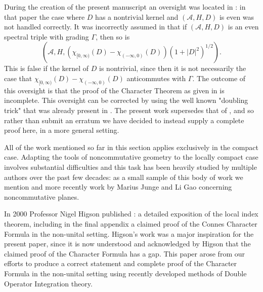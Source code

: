     During the creation of the present manuscript an oversight was located in \cite{CRSZ}: in that paper the case where $D$ has a nontrivial kernel
    and $(\mathcal{A},H,D)$ is even was not handled correctly. It was incorrectly assumed in \cite[Case 3, page 20]{CRSZ} that if $(\mathcal{A},H,D)$ is an even spectral triple
    with grading $\Gamma$, then so is
    $$(\mathcal{A},H,(\chi_{[0,\infty)}(D)-\chi_{(-\infty,0)}(D))(1+|D|^2)^{1/2}).$$
    This is false if the kernel of $D$ is nontrivial, since then it is not necessarily the case that $\chi_{[0,\infty)}(D)-\chi_{(-\infty,0)}(D)$ anticommutes with $\Gamma$. The outcome of this oversight is that the proof of the Character Theorem as given in \cite{CRSZ} is incomplete. This oversight can be corrected by using the well known "doubling trick" that was already present in \cite[Definition 6]{CPRS1}. The present work supersedes that of \cite{CRSZ}, and so rather than submit an erratum we have decided to instead supply a complete
    proof here, in a more general setting.
    
    
    All of the work mentioned so far in this section applies exclusively in the compact case. Adapting the tools of noncommutative geometry to the locally compact case involves substantial difficulties and this task has been heavily studied by multiple authors over the past few decades: as a small sample of this body of work we mention \cite{Rennie-2003, Rennie-2004, gayral-moyal, GIV, CGRS1, CGRS2} and more recently work by Marius Junge and Li Gao concerning noncommutative planes.
    
    In 2000 Professor Nigel Higson published \cite{higson}: a detailed exposition of the local index theorem, including in the final appendix a claimed proof 
    of the Connes Character Formula in the non-unital setting. Higson's work was a major inspiration for the present paper, 
    since it is now understood and acknowledged by Higson that the claimed proof of the Character Formula 
    \cite[Theorem C.3]{higson} has a gap. This paper arose from our efforts to produce a correct statement and complete proof of the Character Formula in the non-unital setting using
    recently developed methods of Double Operator Integration theory.
    
